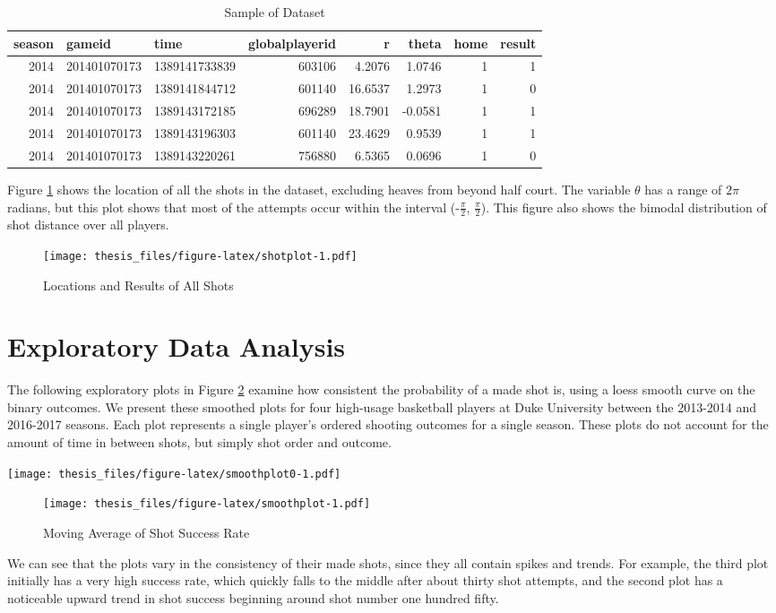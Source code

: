 \documentclass[12pt,twoside]{dukestatscithesis}
\theoremstyle{definition}
\theoremstyle{definition}
\theoremstyle{definition}
\theoremstyle{remark}
\begin{document}
\begingroup\fontsize{11}{13}\selectfont
\begin{longtable}[t]{rllrrrrr}
\caption[Data Sample]{\label{tab:sampletable}Sample of Dataset}\\
\toprule
season & gameid & time & globalplayerid & r & theta & home & result\\
\midrule
2014 & 201401070173 & 1389141733839 & 603106 & 4.2076 & 1.0746 & 1 & 1\\
2014 & 201401070173 & 1389141844712 & 601140 & 16.6537 & 1.2973 & 1 & 0\\
2014 & 201401070173 & 1389143172185 & 696289 & 18.7901 & -0.0581 & 1 & 1\\
2014 & 201401070173 & 1389143196303 & 601140 & 23.4629 & 0.9539 & 1 & 1\\
2014 & 201401070173 & 1389143220261 & 756880 & 6.5365 & 0.0696 & 1 & 0\\
\bottomrule
\end{longtable}
\endgroup{}

Figure \ref{fig:shotplot} shows the location of all the shots in the
dataset, excluding heaves from beyond half court. The variable
\(\theta\) has a range of \(2\pi\) radians, but this plot shows that
most of the attempts occur within the interval (-\(\frac{\pi}{2}\),
\(\frac{\pi}{2}\)). This figure also shows the bimodal distribution of
shot distance over all players.
\begin{figure}[htbp]
\centering
\texttt{[image: thesis\_files/figure-latex/shotplot-1.pdf]}
\caption{\label{fig:shotplot}Locations and Results of All Shots}
\end{figure}
\section{Exploratory Data Analysis}\label{exploratory-data-analysis}

The following exploratory plots in Figure \ref{fig:smoothplot} examine
how consistent the probability of a made shot is, using a loess smooth
curve on the binary outcomes. We present these smoothed plots for four
high-usage basketball players at Duke University between the 2013-2014
and 2016-2017 seasons. Each plot represents a single player's ordered
shooting outcomes for a single season. These plots do not account for
the amount of time in between shots, but simply shot order and outcome.

\texttt{[image: thesis\_files/figure-latex/smoothplot0-1.pdf]}
\begin{figure}[htbp]
\centering
\texttt{[image: thesis\_files/figure-latex/smoothplot-1.pdf]}
\caption{\label{fig:smoothplot}Moving Average of Shot Success Rate}
\end{figure}
We can see that the plots vary in the consistency of their made shots,
since they all contain spikes and trends. For example, the third plot
initially has a very high success rate, which quickly falls to the
middle after about thirty shot attempts, and the second plot has a
noticeable upward trend in shot success beginning around shot number one
hundred fifty.
\end{document}

